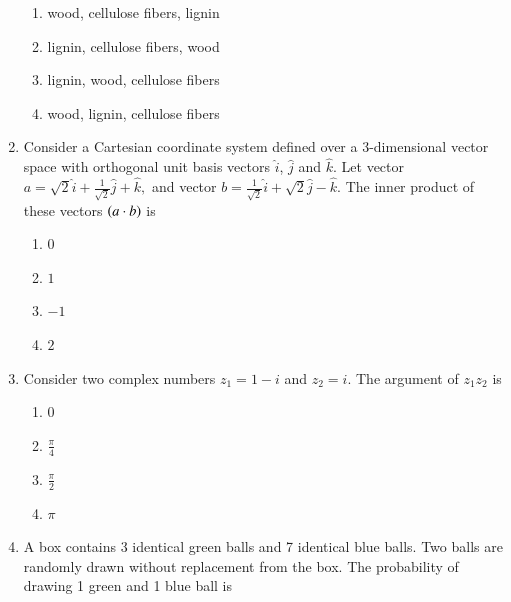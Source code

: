 \documentclass[journal,12pt,onecolumn]{IEEEtran}
\theoremstyle{remark}
\begin{document}
\begin{enumerate}
		\hfill{}
		
		\begin{enumerate}
			\item {} wood,  cellulose fibers,  lignin
			\item {} lignin,  cellulose fibers,  wood
			\item {} lignin,  wood,  cellulose fibers
			\item {} wood,  lignin,  cellulose fibers
		\end{enumerate}
		
		\item Consider a Cartesian coordinate system defined over a 3-dimensional vector space with orthogonal unit basis vectors $\hat{i}$, $\hat{j}$ and $\hat{k}$. Let vector $a=\sqrt{2}\hat{i}+\frac{1}{\sqrt{2}}\hat{j}+\hat{k},$ and vector $b=\frac{1}{\sqrt{2}}\hat{i}+\sqrt{2}\hat{j}-\hat{k}.$ The inner product of these vectors $\left(a\cdot b\right)$ is
		
		\hfill{}
		
		\begin{multicols}{2}
			\begin{enumerate}
				\item $0$
				\item $1$
				\item $-1$
				\item $2$
			\end{enumerate}
		\end{multicols}
		
		\item Consider two complex numbers $z_{1}=1-i$ and $z_{2}=i$. The argument of $z_{1}z_{2}$ is
		
		\hfill{}
		
		\begin{multicols}{4}
			\begin{enumerate}
				\item $0$
				\item $\frac{\pi}{4}$
				\item $\frac{\pi}{2}$
				\item $\pi$
			\end{enumerate}
		\end{multicols}
		
		\item A box contains 3 identical green balls and 7 identical blue balls. Two balls are randomly drawn without replacement from the box. The probability of drawing 1 green and 1 blue ball is
		

\end{enumerate}
\end{document}
